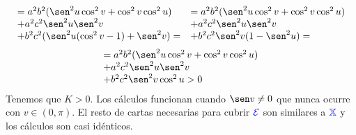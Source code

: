 \documentclass{article}
\newcommand{\bb}[1]{\mathbb{#1}}
\begin{document}
$$
\begin{array}{l}
  = a^2b^2 (\sen^2 u \cos^2 v + \cos^2 v \cos^2 u) \\
  + a^2c^2 \sen^2 u \sen^2 v \\
  + b^2c^2 (\sen^2 u (\cos^2 v - 1) + \sen^2 v) =
\end{array}
\begin{array}{l}
  = a^2b^2 (\sen^2 u \cos^2 v + \cos^2 v \cos^2 u) \\
  + a^2c^2 \sen^2 u \sen^2 v \\
  + b^2c^2 \sen^2 v (1 - \sen^2 u) =
\end{array}
$$
$$
\begin{array}{l}
  = a^2b^2 (\sen^2 u \cos^2 v + \cos^2 v \cos^2 u) \\
  + a^2c^2 \sen^2 u \sen^2 v \\
  + b^2c^2 \sen^2 v \cos^2 u > 0
\end{array}
$$
Tenemos que $K>0$. Los cálculos funcionan cuando $\sen v \ne 0$ que nunca ocurre con $v\in (0, \pi)$. El resto de cartas necesarias para cubrir $\textcolor{blue}{\mathcal{E}}$ son similares a $\textcolor{blue}{\bb{X}}$ y los cálculos son casi idénticos.
\end{document}
